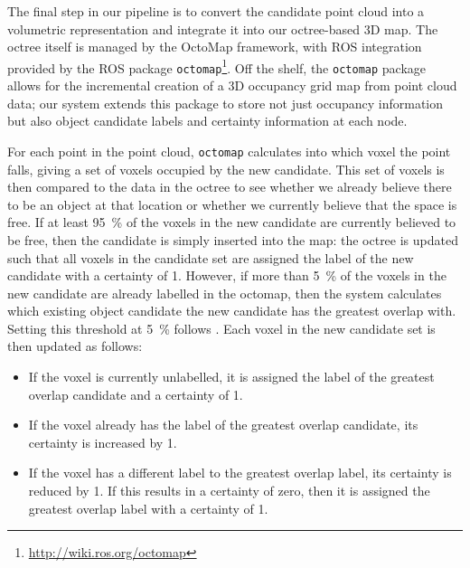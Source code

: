 The final step in our pipeline is to convert the candidate point cloud into a volumetric representation and integrate it into our octree-based 3D map.
The octree itself is managed by the OctoMap framework\cite{hornung13octomap}, with ROS integration provided by the ROS package \texttt{octomap}\footnote{\url{http://wiki.ros.org/octomap}}.
Off the shelf, the \texttt{octomap} package allows for the incremental creation of a 3D occupancy grid map from point cloud data; our system extends this package to store not just occupancy information but also object candidate labels and certainty information at each node.


For each point in the point cloud, \texttt{octomap} calculates into which voxel the point falls, giving a set of voxels occupied by the new candidate.
This set of voxels is then compared to the data in the octree to see whether we already believe there to be an object at that location or whether we currently believe that the space is free.
If at least \SI{95}{\percent} of the voxels in the new candidate are currently believed to be free, then the candidate is simply inserted into the map: the octree is updated such that all voxels in the candidate set are assigned the label of the new candidate with a certainty of \num{1}.
However, if more than \SI{5}{\percent} of the voxels in the new candidate are already labelled in the octomap, then the system calculates which existing object candidate the new candidate has the greatest overlap with.
Setting this threshold at \SI{5}{\percent} follows \cite{garcia2013computational}.
Each voxel in the new candidate set is then updated as follows:

\begin{itemize}
	\item If the voxel is currently unlabelled, it is assigned the label of the greatest overlap candidate and a certainty of \num{1}.
	\item If the voxel already has the label of the greatest overlap candidate, its certainty is increased by \num{1}.
	\item If the voxel has a different label to the greatest overlap label, its certainty is reduced by \num{1}. If this results in a certainty of zero, then it is assigned the greatest overlap label with a certainty of \num{1}.
\end{itemize}
